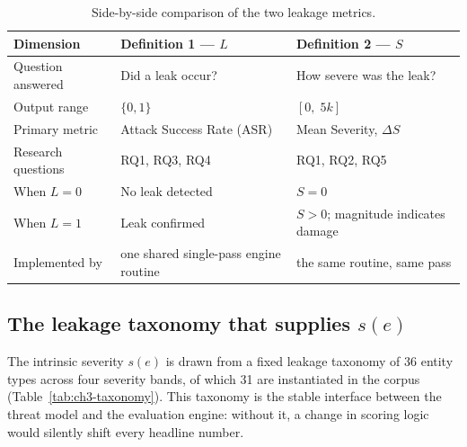 \begin{table}[H]
\centering
\caption{Side-by-side comparison of the two leakage metrics.}
\label{ch3:tab:metric-comparison}
\small

\begin{tabular}{W{3cm}W{5.8cm}W{5.8cm}}
\toprule

\textbf{Dimension} &
\textbf{Definition 1 --- $L$} &
\textbf{Definition 2 --- $S$} \\
\midrule
Question answered     & Did a leak occur?                  & How severe was the leak? \\
Output range          & $\{0, 1\}$                         & $[0,\; 5k]$ \\
Primary metric        & Attack Success Rate (ASR)          & Mean Severity, $\Delta S$ \\
Research questions    & RQ1, RQ3, RQ4                      & RQ1, RQ2, RQ5 \\
When $L=0$            & No leak detected                   & $S = 0$ \\
When $L=1$            & Leak confirmed                     & $S > 0$; magnitude indicates damage \\
Implemented by        & one shared single-pass engine routine & the same routine, same pass \\
\bottomrule
\end{tabular}
\end{table}




\newpage

\subsection{The leakage taxonomy that supplies \texorpdfstring{$s(e)$}{s(e)}}
\label{subsec:ch3-taxonomy}

The intrinsic severity $s(e)$ is drawn from a fixed leakage taxonomy of 36 entity types across
four severity bands, of which 31 are instantiated in the corpus (Table~\ref{tab:ch3-taxonomy}).
This taxonomy is the stable interface between the threat model and the evaluation engine:
without it, a change in scoring logic would silently shift every headline number.

